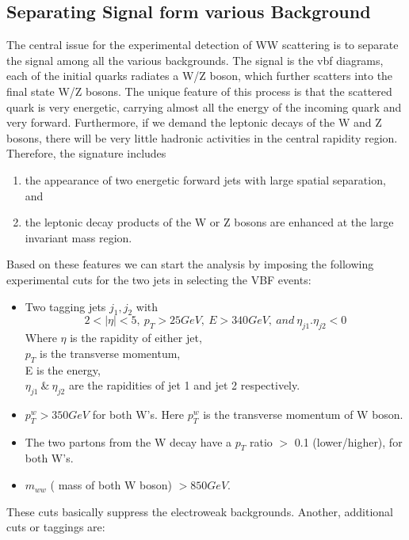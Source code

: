 \subsection{Separating Signal form various Background}
The central issue for the experimental detection of WW scattering is to separate the signal among all the various backgrounds. The signal is the {vbf} diagrams, each of the initial quarks radiates a W/Z boson, which further scatters into the final state W/Z bosons. The unique feature of this process is that the scattered quark is very energetic, carrying almost all the energy of the incoming quark and very forward. Furthermore, if we demand the leptonic decays of the W and Z bosons, there will be very little hadronic activities in the central rapidity region. Therefore, the signature includes
	\begin{enumerate}
		\item the appearance of two energetic forward jets with large spatial separation, and 
		\item the leptonic decay products of the W or Z bosons are enhanced at the large invariant mass region.
	\end{enumerate}
Based on these features we can start the analysis by imposing the following experimental cuts for the two jets in selecting the VBF events:
	\begin{itemize}
		\item Two tagging jets $j_1,j_2$ with \begin{equation} 2<|\eta|<5,~ p_T>25GeV,~E>340GeV,~and~\eta_{j1}.\eta_{j2}<0 \end{equation} Where $\eta$ is the rapidity of either jet,\\ $p_T$ is the transverse momentum,\\ E is the energy, \\ $\eta_{j1} ~ \& ~ \eta_{j2}$ are the rapidities of jet 1 and jet 2 respectively.
		\item $p^w_T>350GeV$ for both W's. Here $p^w_T$ is the transverse momentum of W boson.
		\item The two partons from the W decay have a $p_T$ ratio $>$ 0.1 (lower/higher), for both W's.
		\item $m_{ww}$ ( mass of both W boson) $>850GeV$.
	\end{itemize}
These cuts basically suppress the electroweak backgrounds.
Another, additional cuts or taggings are:
